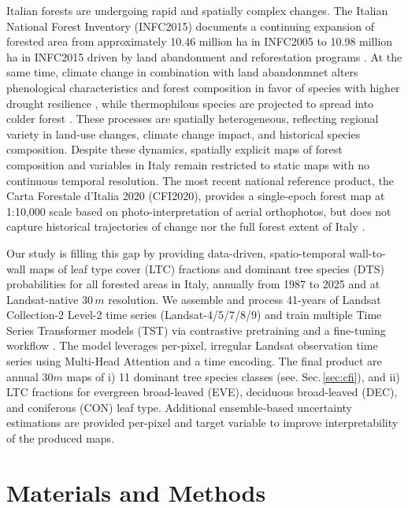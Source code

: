 \documentclass[essd, manuscript]{copernicus}
\begin{document}
Italian forests are undergoing rapid and spatially complex changes. The Italian National Forest Inventory (INFC2015) documents a continuing expansion of forested area from approximately 10.46 million ha in INFC2005 to 10.98 million ha in INFC2015 driven by land abandonment and reforestation programs \citep{gasparini_italian_2022}. At the same time, climate change in combination with land abandonmnet alters phenological characteristics and forest composition in favor of species with higher drought resilience \citep{chelli_climate_2017,herraiz_aridity-induced_2025}, while thermophilous species are projected to spread into colder forest \citep{bricca_topography_2026}. These  processes are spatially heterogeneous, reflecting regional variety in land-use changes, climate change impact, and historical species composition. Despite these dynamics, spatially explicit maps of forest composition and variables in Italy remain restricted to static maps with no continuous temporal resolution. The most recent national reference product, the Carta Forestale d'Italia 2020 (CFI2020), provides a single-epoch forest map at 1:10,000 scale based on photo-interpretation of aerial orthophotos, but does not capture historical trajectories of change nor the full forest extent of Italy \citep{mattioli_carta_2025}.

Our study is filling this gap by providing data-driven, spatio-temporal wall-to-wall maps of leaf type cover (LTC) fractions and dominant tree species (DTS) probabilities for all forested areas in Italy, annually from 1987 to 2025 and at Landsat-native $30\,\unit{m}$ resolution. We assemble and process 41-years of Landsat Collection-2 Level-2 time series (Landsat-4/5/7/8/9) and train multiple Time Series Transformer models (TST) via contrastive pretraining and a fine-tuning workflow \citep{ruswurm_self-attention_2020,zerveas_transformer-based_2020,chen_simple_2020}. The model leverages per-pixel, irregular Landsat observation time series using Multi-Head Attention and a time encoding. The final product are annual $30m$ maps of i) 11 dominant tree species classes (see. Sec.\,\ref{sec:cfi}), and ii) LTC fractions for evergreen broad-leaved (EVE), deciduous broad-leaved (DEC), and coniferous (CON) leaf type. Additional ensemble-based uncertainty estimations are provided per-pixel and target variable to improve interpretability of the produced maps.

\section{Materials and Methods}
\end{document}
